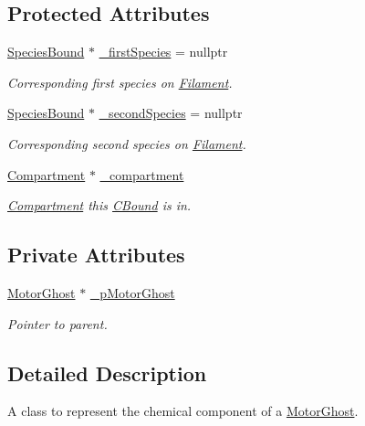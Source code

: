 \subsection*{Protected Attributes}
\begin{DoxyCompactItemize}
\item 
\hyperlink{classSpeciesBound}{Species\+Bound} $\ast$ \hyperlink{classCBound_a7ee4f44fd39c414be1f7b74b1031c1ce}{\+\_\+first\+Species} = nullptr
\begin{DoxyCompactList}\small\item\em Corresponding first species on \hyperlink{classFilament}{Filament}. \end{DoxyCompactList}\item 
\hyperlink{classSpeciesBound}{Species\+Bound} $\ast$ \hyperlink{classCBound_ae6818ab861d273598a2507be75183e41}{\+\_\+second\+Species} = nullptr
\begin{DoxyCompactList}\small\item\em Corresponding second species on \hyperlink{classFilament}{Filament}. \end{DoxyCompactList}\item 
\hyperlink{classCompartment}{Compartment} $\ast$ \hyperlink{classCBound_a95a66719b898cf32e60ae7137186bbbf}{\+\_\+compartment}
\begin{DoxyCompactList}\small\item\em \hyperlink{classCompartment}{Compartment} this \hyperlink{classCBound}{C\+Bound} is in. \end{DoxyCompactList}\end{DoxyCompactItemize}
\subsection*{Private Attributes}
\begin{DoxyCompactItemize}
\item 
\hyperlink{classMotorGhost}{Motor\+Ghost} $\ast$ \hyperlink{classCMotorGhost_a248b8fee5ba1d85c989f666e3a908261}{\+\_\+p\+Motor\+Ghost}
\begin{DoxyCompactList}\small\item\em Pointer to parent. \end{DoxyCompactList}\end{DoxyCompactItemize}


\subsection{Detailed Description}
A class to represent the chemical component of a \hyperlink{classMotorGhost}{Motor\+Ghost}. 

